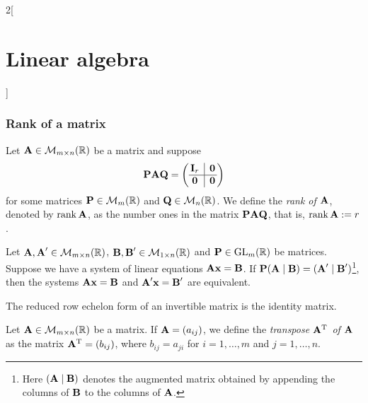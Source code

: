 \documentclass[../../../main.tex]{subfiles}
\begin{document}
\begin{multicols}{2}[\section{Linear algebra}]
    \subsubsection*{Rank of a matrix}
    \begin{definition}[Rank]
        Let $\boldsymbol{\mathrm{A}}\in\mathcal{M}_{m\times n}(\mathbb{R})$ be a matrix and suppose
        $$\vectorfunction{P}\vectorfunction{A}\vectorfunction{Q}=\left(
            \begin{array}{@{\,} c|c @{\,}}
                    \vectorfunction{I}_r & \vectorfunction{0} \\
                    \hline
                    \vectorfunction{0}   & \vectorfunction{0}
                \end{array}
            \right)$$ for some matrices $\boldsymbol{\mathrm{P}}\in\mathcal{M}_m(\mathbb{R})$ and $\boldsymbol{\mathrm{Q}}\in\mathcal{M}_n(\mathbb{R})$. We define the \textit{rank of $\boldsymbol{\mathrm{A}}$}, denoted by $\rank \boldsymbol{\mathrm{A}}$, as the number ones in the matrix $\boldsymbol{\mathrm{P}}\boldsymbol{\mathrm{A}}\boldsymbol{\mathrm{Q}}$, that is, $\rank\boldsymbol{\mathrm{A}}:=r$.
    \end{definition}
    \begin{prop}
        Let $\boldsymbol{\mathrm{A}},\boldsymbol{\mathrm{A}}'\in\mathcal{M}_{m\times n}(\mathbb{R})$, $\boldsymbol{\mathrm{B}},\boldsymbol{\mathrm{B}}'\in\mathcal{M}_{1\times n}(\mathbb{R})$ and $\boldsymbol{\mathrm{P}}\in\mathrm{GL}_m(\mathbb{R})$ be matrices. Suppose we have a system of linear equations $\boldsymbol{\mathrm{A}}\boldsymbol{\mathrm{x}}=\boldsymbol{\mathrm{B}}$. If $\boldsymbol{\mathrm{P}}(\boldsymbol{\mathrm{A}}\mid\boldsymbol{\mathrm{B}})=(\boldsymbol{\mathrm{A}}'\mid\boldsymbol{\mathrm{B}}')$\footnote{Here $(\boldsymbol{\mathrm{A}}\mid\boldsymbol{\mathrm{B}})$ denotes the augmented matrix obtained by appending the columns of $\boldsymbol{\mathrm{B}}$ to the columns of $\boldsymbol{\mathrm{A}}$.}, then the systems $\boldsymbol{\mathrm{A}}\boldsymbol{\mathrm{x}}=\boldsymbol{\mathrm{B}}$ and $\boldsymbol{\mathrm{A}}'\boldsymbol{\mathrm{x}}=\boldsymbol{\mathrm{B}}'$ are equivalent.
    \end{prop}
    \begin{corollary}
        The reduced row echelon form of an invertible matrix is the identity matrix.
    \end{corollary}
    \begin{definition}[Transposition]
        Let $\boldsymbol{\mathrm{A}}\in\mathcal{M}_{m\times n}(\mathbb{R})$ be a matrix. If $\boldsymbol{\mathrm{A}}=(a_{ij})$, we define the \textit{transpose $\vb{A}^{\mathrm{T}}$ of $\boldsymbol{\mathrm{A}}$} as the matrix $\vb{A}^{\mathrm{T}}=(b_{ij})$, where $b_{ij}=a_{ji}$ for $i=1,\ldots,m$ and $j=1,\ldots,n$.

\end{definition}
\end{multicols}
\end{document}
